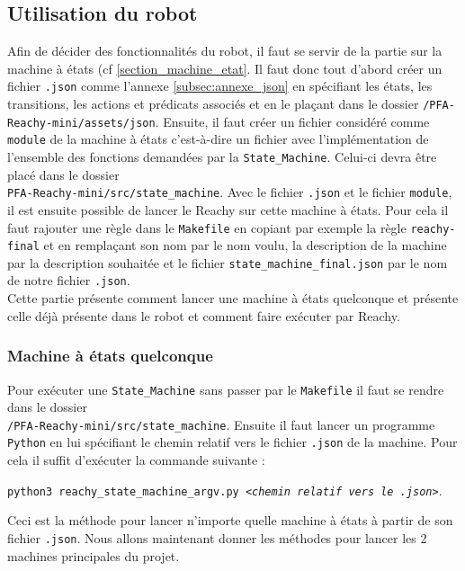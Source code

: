 \documentclass[a4paper,french]{article}
\begin{document}
\subsection{Utilisation du robot} \label{subsec:utilisation}
Afin de décider des fonctionnalités du robot, il faut se servir de la partie sur la machine à états (cf \ref{section_machine_etat}. Il faut donc tout d'abord créer un fichier \texttt{.json} comme l'annexe \ref{subsec:annexe_json} en spécifiant les états, les transitions, les actions et prédicats associés et en le plaçant dans le dossier \texttt{/PFA-Reachy-mini/assets/json}. Ensuite, il faut créer un fichier considéré comme \texttt{module} de la machine à états c'est-à-dire un fichier avec l'implémentation de l'ensemble des fonctions demandées par la \texttt{State\_Machine}. Celui-ci devra être placé dans le dossier \\ \texttt{PFA-Reachy-mini/src/state\_machine}. Avec le fichier \texttt{.json} et le fichier \texttt{module}, il est ensuite possible de lancer le Reachy sur cette machine à états. Pour cela il faut rajouter une règle dans le \texttt{Makefile} en copiant par exemple la règle \texttt{reachy-final} et en remplaçant son nom par le nom voulu, la description de la machine par la description souhaitée et le fichier \texttt{state\_machine\_final.json} par le nom de notre fichier \texttt{.json}.\\

Cette partie présente comment lancer une machine à états quelconque et présente celle déjà présente dans le robot et comment faire exécuter par Reachy.

\subsubsection{Machine à états quelconque}
Pour exécuter une \texttt{State\_Machine} sans passer par le \texttt{Makefile} il faut se rendre dans le dossier \\ \texttt{/PFA-Reachy-mini/src/state\_machine}. Ensuite il faut lancer un programme \texttt{Python} en lui spécifiant le chemin relatif vers le fichier \texttt{.json} de la machine. Pour cela il suffit d'exécuter la commande suivante :
\begin{center}
\texttt{python3 reachy\_state\_machine\_argv.py \textit{<chemin relatif vers le .json>}}. \\
\end{center}

Ceci est la méthode pour lancer n'importe quelle machine à états à partir de son fichier \texttt{.json}. Nous allons maintenant donner les méthodes pour lancer les 2 machines principales du projet.
\end{document}

